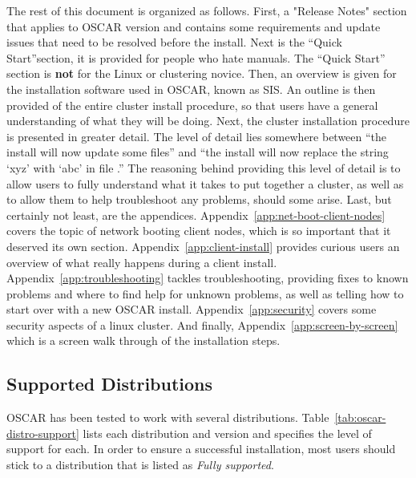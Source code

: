 The rest of this document is organized as follows. 
\begchange First, a "Release Notes" section that applies to OSCAR 
version  \oscarversion\-  and contains some requirements and update issues 
that need to be resolved before the install. \endchange  Next is the 
``Quick Start''section, it is provided for people who hate manuals. The
 ``Quick Start'' section is {\bf not} for the Linux or clustering novice.
 Then, an overview is given for the installation software used in OSCAR, 
known as SIS.  An outline is then provided of the entire cluster install
 procedure, so that users have a general understanding of what they will
 be doing.  Next, the cluster installation procedure is presented in greater 
detail.  The level of detail lies somewhere between
``the install will now update some files'' and ``the install will now
replace the string `xyz' with `abc' in file .'' The
reasoning behind providing this level of detail is to allow users to
fully understand what it takes to put together a cluster, as well as
to allow them to help troubleshoot any problems, should some arise.
Last, but certainly not least, are the appendices.
Appendix~\ref{app:net-boot-client-nodes} covers the topic of network
booting client nodes, which is so important that it deserved its own
section.  Appendix~\ref{app:client-install} provides curious users an
overview of what really happens during a client install.
Appendix~\ref{app:troubleshooting} tackles troubleshooting, providing
fixes to known problems and where to find help for unknown problems,
as well as telling how to start over with a new OSCAR install. \begchange Appendix~\ref{app:security} covers some security aspects of a linux cluster. 
And finally, Appendix~\ref{app:screen-by-screen} which is a screen walk through of
the installation steps.\endchange

\subsection{Supported Distributions}

OSCAR has been tested to work with several distributions.
Table~\ref{tab:oscar-distro-support} lists each distribution and
version and specifies the level of support for each. In order to
ensure a successful installation, most users should stick to a
distribution that is listed as \emph{Fully supported}.



